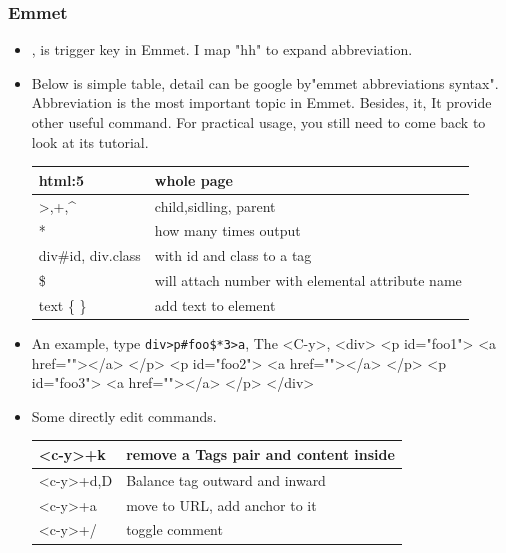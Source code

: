 \documentclass[a4paper,11pt,twoside]{book}
\begin{document}
\subsubsection{Emmet}
\begin{itemize}
		\item <C-y>, is trigger key in Emmet. I map "hh" to expand abbreviation.

		\item Below is simple table, detail can be google by"emmet abbreviations syntax". Abbreviation is the most important topic in Emmet. Besides, it, It provide other useful command.  For practical usage, you still need to come back to look at its tutorial. \\

\begin{tabular}{p{}|p{}}
\hline 
html:5  & whole page \\ 
\hline 
>,+,\^{} & child,sidling, parent  \\ 
\hline 
* &how many times output \\
\hline
div\#id, div.class & with id and class to a tag \\

\hline 
\$ & will attach number with elemental attribute name   \\

\hline
text \{ \} & add text to element \\
\hline
\end{tabular}

\item An example, type \verb=div>p#foo$*3>a=, The <C-y>, 
 <div>
       <p id="foo1">
		   <a href=""></a>
	   </p>
	   <p id="foo2">
		   <a href=""></a>
	   </p>
	   <p id="foo3">
		   <a href=""></a>
	   </p>
</div>

\item Some directly edit commands. \\

\begin{tabular}{p{}|p{}}
\hline 
<c-y>+k  & remove a Tags pair and content inside \\

\hline 
<c-y>+d,D & Balance tag outward and inward  \\

\hline 
<c-y>+a & move to URL, add anchor to it \\

\hline
<c-y>+/ & toggle comment \\


\end{tabular}
\end{itemize}
\end{document}
